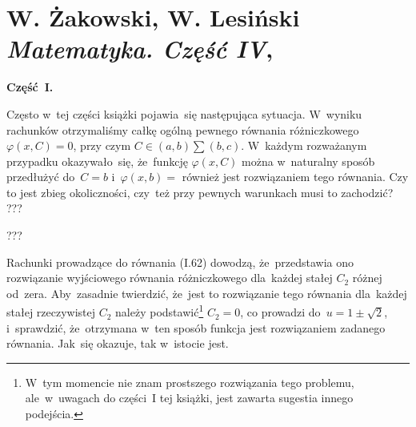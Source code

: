 \documentclass[a4paper,11pt]{article}
\numberwithin{equation}{section}
\begin{document}










\newpage

\section{ %
  W. Żakowski, W. Lesiński \\
  \textit{Matematyka. Część IV},
  \cite{ZakowskiLeksinskiLMatematykaVolIV1978}}

\vspace{0em}



\vspace{0em}


\noindent
\textbf{Część~I.}



\noindent
Często w~tej części książki pojawia~się następująca sytuacja.
W~wyniku rachunków otrzymaliśmy całkę ogólną pewnego równania
różniczkowego $\varphi( x, C ) = 0$, przy czym
$C \in ( a, b ) \sum ( b, c )$. W~każdym rozważanym przypadku
okazywało~się, że~funkcję $\varphi( x, C )$ można w~naturalny sposób
przedłużyć do~$C = b$ i~$\varphi( x, b ) = $ również jest rozwiązaniem
tego równania. Czy to jest zbieg okoliczności, czy~też przy pewnych
warunkach musi to zachodzić? ???

\VerSpaceThree






\vspace{0em}


\noindent
{} ???

\VerSpaceFour





\noindent
{} Rachunki prowadzące do równania (I.62) dowodzą,
że~przedstawia ono rozwiązanie wyjściowego równania różniczkowego
dla~każdej stałej $C_{ 2 }$ różnej od~zera. Aby~zasadnie twierdzić,
że~jest to rozwiązanie tego równania dla~każdej stałej rzeczywistej
$C_{ 2 }$ należy podstawić\footnote{W~tym momencie nie znam prostszego
  rozwiązania tego problemu, ale~w~uwagach do części~I tej książki,
  jest zawarta sugestia innego podejścia.} $C_{ 2 } = 0$, co prowadzi
do~$u = 1 \pm \sqrt{2}$, i~sprawdzić, że~otrzymana w~ten sposób
funkcja jest rozwiązaniem zadanego równania. Jak~się okazuje, tak
w~istocie jest.
\end{document}
